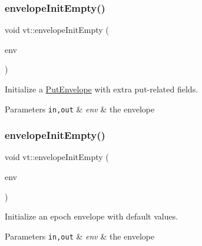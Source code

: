 \subsubsection{\texorpdfstring{envelope\+Init\+Empty()}{envelopeInitEmpty()}\hspace{0.1cm}{\footnotesize\ttfamily [2/5]}}
{\footnotesize\ttfamily void vt\+::envelope\+Init\+Empty (\begin{DoxyParamCaption}\item[{\hyperlink{namespacevt_a4e561211bbf1d8d9a4766eb159852736}{Put\+Short\+Envelope} \&}]{env }\end{DoxyParamCaption})\hspace{0.3cm}{\ttfamily [inline]}}



Initialize a {\ttfamily \hyperlink{structvt_1_1_put_envelope}{Put\+Envelope}} with extra put-\/related fields. 


\begin{DoxyParams}[1]{Parameters}
\mbox{\tt in,out}  & {\em env} & the envelope \\
\hline
\end{DoxyParams}
\mbox{\label{namespacevt_ae56472f58b6582abacae687ead397380}} 
\subsubsection{\texorpdfstring{envelope\+Init\+Empty()}{envelopeInitEmpty()}\hspace{0.1cm}{\footnotesize\ttfamily [3/5]}}
{\footnotesize\ttfamily void vt\+::envelope\+Init\+Empty (\begin{DoxyParamCaption}\item[{\hyperlink{namespacevt_af71a025689a3da5037785b53a7a8e78c}{Epoch\+Envelope} \&}]{env }\end{DoxyParamCaption})\hspace{0.3cm}{\ttfamily [inline]}}



Initialize an epoch envelope with default values. 


\begin{DoxyParams}[1]{Parameters}
\mbox{\tt in,out}  & {\em env} & the envelope \\
\hline
\end{DoxyParams}
\mbox{\label{namespacevt_a2c8d0d4109460ccb89316ca4b3cc3aea}} 
